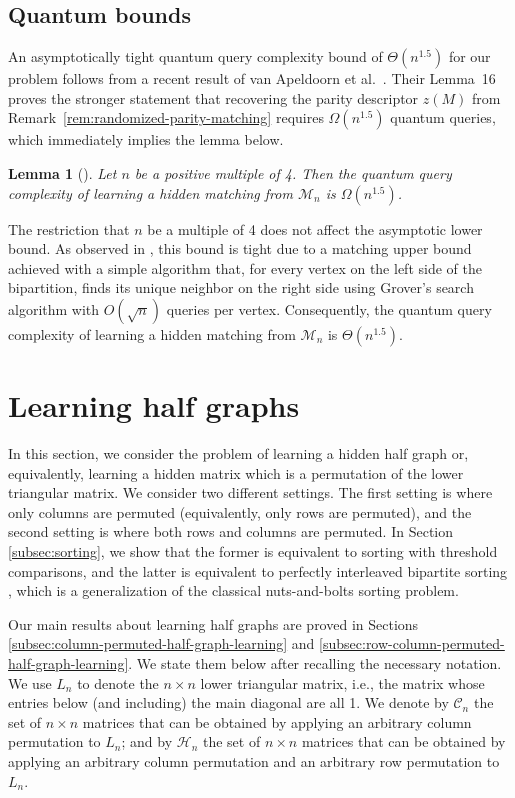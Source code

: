 \documentclass[11pt]{article}
\newcommand{\cC}{\mathcal{C}}
\newcommand{\cH}{\mathcal{H}}
\newcommand{\cM}{\mathcal{M}}
\newtheorem{lemma}[theorem]{Lemma}
\begin{document}
\subsection{Quantum bounds}

An asymptotically tight quantum query complexity bound of $\Theta(n^{1.5})$ for our problem follows from a recent result of van Apeldoorn et al.~\cite{AGLNWW21}. Their Lemma~16 proves the stronger statement that recovering the parity descriptor $z(M)$ from Remark~\ref{rem:randomized-parity-matching} requires $\Omega(n^{1.5})$ quantum queries, which immediately implies the lemma below.
\begin{lemma}[{\cite[Lemma~16]{AGLNWW21}}]\label{lem: quantum matching}
    Let $n$ be a positive multiple of 4. Then the quantum query complexity of learning a hidden matching from $\cM_n$ is $\Omega(n^{1.5})$.
\end{lemma}
The restriction that $n$ be a multiple of 4 does not affect the asymptotic lower bound.
As observed in \cite{AGLNWW21}, this bound is tight due to a matching upper bound achieved with a simple algorithm that, for every vertex on the left side of the bipartition, finds its unique neighbor on the right side using Grover's search algorithm with $O(\sqrt{n})$ queries per vertex. Consequently, the quantum query complexity of learning a hidden matching from $\cM_n$ is $\Theta(n^{1.5})$.


\section{Learning half graphs}\label{sec:learning-half-graphs}
In this section, we consider the problem of learning a hidden half graph or, equivalently, learning a hidden matrix which is a permutation of the lower triangular matrix.
We consider two different settings.
The first setting is where only columns are permuted (equivalently, only rows are permuted), and the second setting is where both rows and columns are permuted. In Section \ref{subsec:sorting}, we show that the former is equivalent to sorting with threshold comparisons, and the latter is equivalent to perfectly interleaved bipartite sorting \cite{GJarxiv, GJapprox}, which is a generalization of the classical nuts-and-bolts sorting problem.
 
Our main results about learning half graphs are proved in Sections \ref{subsec:column-permuted-half-graph-learning} and \ref{subsec:row-column-permuted-half-graph-learning}. We state them below after recalling the necessary notation.
We use $L_n$ to denote the $n \times n$ lower triangular matrix, i.e., the matrix whose entries below (and including) the main diagonal are all 1. 
We denote by $\cC_n$ the set of $n \times n$ matrices that can be obtained by applying an arbitrary column permutation to $L_n$; and by $\cH_n$ the set of $n \times n$ matrices that can be obtained by applying an arbitrary column permutation and an arbitrary row permutation to $L_n$.
\end{document}
